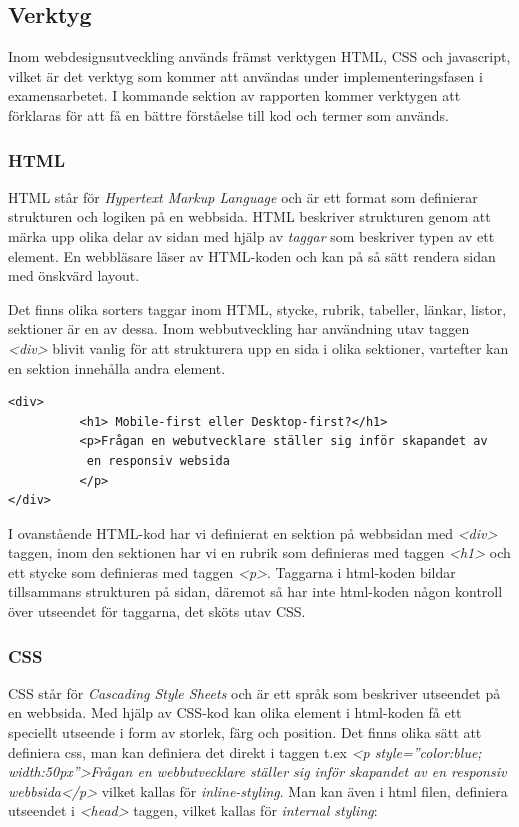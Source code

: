 \documentclass[11pt]{article}
\begin{document}
\subsection{Verktyg}

Inom webdesignsutveckling används främst verktygen HTML, CSS och javascript, vilket är det verktyg som kommer att användas under implementeringsfasen i examensarbetet.  I kommande sektion av rapporten kommer verktygen att förklaras för att få en bättre förståelse till kod och termer som används.

\subsubsection{HTML}
HTML står för \textit{Hypertext Markup Language} och är ett format som definierar strukturen och logiken på en webbsida. HTML beskriver strukturen genom att märka upp olika delar av sidan med hjälp av \textit{taggar} som beskriver typen av ett element. En webbläsare läser av HTML-koden och kan på så sätt rendera sidan med önskvärd layout.

Det finns olika sorters taggar inom HTML, stycke, rubrik, tabeller, länkar, listor, sektioner är en av dessa. Inom webbutveckling har användning utav taggen \textit{<div>} blivit vanlig för att strukturera upp en sida i olika sektioner, vartefter kan en sektion innehålla andra element.

\vspace{1cm}
\begin{verbatim}
<div> 
          <h1> Mobile-first eller Desktop-first?</h1>
          <p>Frågan en webutvecklare ställer sig inför skapandet av
           en responsiv websida
          </p>
</div>
\end{verbatim}
\vspace{1cm}

I ovanstående HTML-kod har vi definierat en sektion på webbsidan med \textit{<div>} taggen, inom den sektionen har vi en rubrik som definieras med taggen \textit{<h1>} och ett stycke som definieras med taggen \textit{<p>}. Taggarna i html-koden bildar tillsammans strukturen på sidan, däremot så har inte html-koden någon kontroll över utseendet för taggarna, det sköts utav CSS.  

\subsubsection{CSS}
CSS står för \textit{Cascading Style Sheets} och är ett språk som beskriver utseendet på en webbsida.
Med hjälp av CSS-kod kan olika element i html-koden få ett speciellt utseende i form av storlek, färg och position. Det finns olika sätt att definiera css, man kan definiera det direkt i taggen t.ex \textit{<p style=”color:blue; width:50px”>Frågan en webbutvecklare ställer sig inför skapandet av en responsiv webbsida</p>} vilket kallas för \textit{inline-styling}. Man kan även i html filen, definiera utseendet i \textit{<head>} taggen, vilket kallas för \textit{internal styling}:
\end{document}
